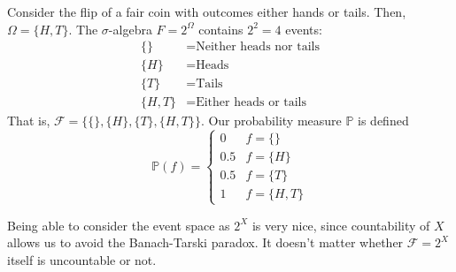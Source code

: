 \documentclass{article}
\begin{document}
      \begin{example}
        Consider the flip of a fair coin with outcomes either hands or tails. Then, $\Omega = \{H, T\}$. The $\sigma$-algebra $F = 2^{\Omega}$ contains $2^2 = 4$ events: 
        \begin{align*}
          \{\} &= \text{Neither heads nor tails} \\
          \{H\} &= \text{Heads} \\
          \{T\} &= \text{Tails} \\
          \{H, T\} &= \text{Either heads or tails}
        \end{align*}
        That is, $\mathcal{F} = \{\{\}, \{H\}, \{T\}, \{H, T\}\}$. Our probability measure $\mathbb{P}$ is defined
        \begin{equation}
          \mathbb{P}(f) = \begin{cases}
          0 & f = \{\} \\
          0.5 & f = \{H\} \\
          0.5 & f = \{T\} \\
          1 & f = \{H, T\}
          \end{cases}
        \end{equation}
      \end{example}

      Being able to consider the event space as $2^X$ is very nice, since countability of $X$ allows us to avoid the Banach-Tarski paradox. It doesn't matter whether $\mathcal{F} = 2^X$ itself is uncountable or not. 
\end{document}

